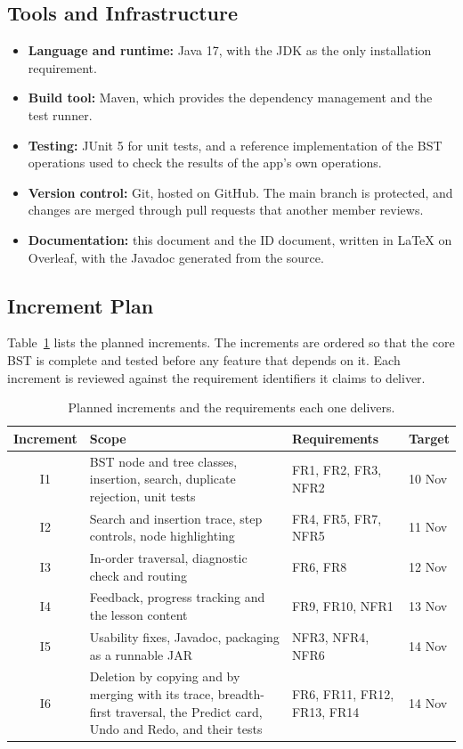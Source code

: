 \subsection{Tools and Infrastructure}
\begin{itemize}
    \item \textbf{Language and runtime:} Java 17, with the JDK as the only installation requirement.
    \item \textbf{Build tool:} Maven, which provides the dependency management and the test runner.
    \item \textbf{Testing:} JUnit 5 for unit tests, and a reference implementation of the BST operations used to check the results of the app's own operations.
    \item \textbf{Version control:} Git, hosted on GitHub. The main branch is protected, and changes are merged through pull requests that another member reviews.
    \item \textbf{Documentation:} this document and the ID document, written in LaTeX on Overleaf, with the Javadoc generated from the source.
\end{itemize}

\subsection{Increment Plan}
Table~\ref{tab:increments} lists the planned increments. The increments are ordered so that the core BST is complete and tested before any feature that depends on it. Each increment is reviewed against the requirement identifiers it claims to deliver.

\begin{table}[H]
\centering
\small
\caption{Planned increments and the requirements each one delivers.}
\label{tab:increments}
\begin{tabularx}{\textwidth}{c X p{3.6cm} l}
\toprule
Increment & Scope & Requirements & Target \\
\midrule
I1 & BST node and tree classes, insertion, search, duplicate rejection, unit tests & FR1, FR2, FR3, NFR2 & 10 Nov \\
I2 & Search and insertion trace, step controls, node highlighting & FR4, FR5, FR7, NFR5 & 11 Nov \\
I3 & In-order traversal, diagnostic check and routing & FR6, FR8 & 12 Nov \\
I4 & Feedback, progress tracking and the lesson content & FR9, FR10, NFR1 & 13 Nov \\
I5 & Usability fixes, Javadoc, packaging as a runnable JAR & NFR3, NFR4, NFR6 & 14 Nov \\
I6 & Deletion by copying and by merging with its trace, breadth-first traversal, the Predict card, Undo and Redo, and their tests & FR6, FR11, FR12, FR13, FR14 & 14 Nov \\
\bottomrule
\end{tabularx}
\end{table}

